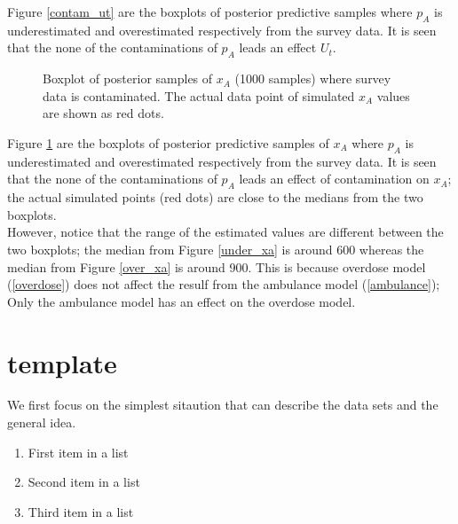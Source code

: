 \documentclass[
10pt, %
letterpaper, %
oneside, %
headinclude,footinclude, %
BCOR5mm, %
]{article}
\begin{document}
Figure \ref{contam_ut} are the boxplots of posterior predictive samples where $p_A$ is underestimated and overestimated respectively from the survey data. It is seen that the none of the contaminations of $p_A$ leads an effect  $U_t$.\\

\begin{figure}[htb]
	\centering
	\caption[two early result box plots:xa]{Boxplot of posterior samples of $x_A$ (1000 samples) where survey data is contaminated.  The actual data point of simulated $x_A$ values are shown as red dots.}
	\label{contam_xt}
\end{figure}

Figure \ref{contam_xt}  are the boxplots of posterior predictive samples of $x_A$ where $p_A$ is underestimated and overestimated respectively from the survey data. It is seen that the none of the contaminations of $p_A$ leads an effect of contamination on $x_A$; the actual simulated points (red dots) are close to the medians from the two boxplots. \\

However, notice that the range of the estimated values are different between the two boxplots; the median from Figure \ref{under_xa} is around 600 whereas the median from Figure \ref{over_xa} is around 900. This is because overdose model (\ref{overdose}) does not affect the resulf from the ambulance model (\ref{ambulance}); Only the ambulance model has an effect on the overdose model. 




\section{template}
We first focus on the simplest sitaution that can describe the data sets and the general idea.


\begin{enumerate}[noitemsep] %
\item First item in a list
\item Second item in a list
\item Third item in a list
\end{enumerate}
\end{document}
